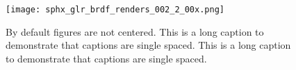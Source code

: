 \begin{figure}[ht]
  \texttt{[image: sphx\_glr\_brdf\_renders\_002\_2\_00x.png]}
  \caption
  {%
    By default figures are not centered.
    This is a long caption to demonstrate that captions are single spaced.
    This is a long caption to demonstrate that captions are single spaced.%
  }
  \label{fi:not-centered}
\end{figure}